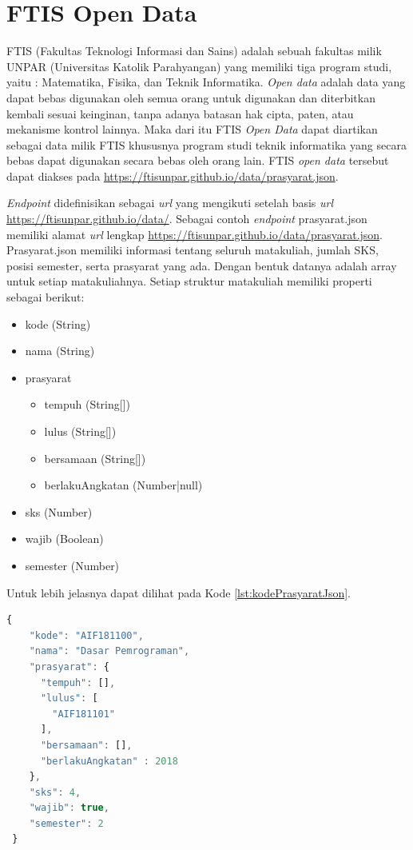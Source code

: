 \section{FTIS Open Data}
FTIS (Fakultas Teknologi Informasi dan Sains) adalah sebuah fakultas milik UNPAR (Universitas Katolik Parahyangan) yang memiliki tiga program studi, yaitu : Matematika, Fisika, dan Teknik Informatika. \textit{Open data} adalah data yang dapat bebas digunakan oleh semua orang untuk digunakan dan diterbitkan kembali sesuai keinginan, tanpa adanya batasan hak cipta, paten, atau mekanisme kontrol lainnya. Maka dari itu FTIS \textit{Open Data} dapat diartikan sebagai data milik FTIS khususnya program studi teknik informatika yang secara bebas dapat digunakan secara bebas oleh orang lain. FTIS \textit{open data} tersebut dapat diakses pada \url{https://ftisunpar.github.io/data/prasyarat.json}. \cite{ftisOpenData}

\textit{Endpoint} didefinisikan sebagai \textit{url} yang mengikuti setelah basis \textit{url} \url{https://ftisunpar.github.io/data/}. Sebagai contoh \textit{endpoint} prasyarat.json memiliki alamat \textit{url} lengkap \url{https://ftisunpar.github.io/data/prasyarat.json}. Prasyarat.json memiliki informasi tentang seluruh matakuliah, jumlah SKS, posisi semester, serta prasyarat yang ada. Dengan bentuk datanya adalah array untuk setiap matakuliahnya. Setiap struktur matakuliah memiliki properti sebagai berikut: 

\begin{itemize}
    \item kode (String)
    \item nama (String)
    \item prasyarat
    \begin{itemize}
        \item tempuh (String[])
        \item lulus (String[])
        \item bersamaan (String[])
        \item berlakuAngkatan (Number|null)
    \end{itemize}
    \item sks (Number)
    \item wajib (Boolean)
    \item semester (Number)
\end{itemize}

Untuk lebih jelasnya dapat dilihat pada Kode \ref{lst:kodePrasyaratJson}.
\begin{lstlisting}[language=JavaScript, caption=prasyarat.json\label{lst:kodePrasyaratJson}]
{
    "kode": "AIF181100",
    "nama": "Dasar Pemrograman",
    "prasyarat": {
      "tempuh": [],
      "lulus": [
        "AIF181101"
      ],
      "bersamaan": [],
      "berlakuAngkatan" : 2018
    },
    "sks": 4,
    "wajib": true,
    "semester": 2
 }
\end{lstlisting}


